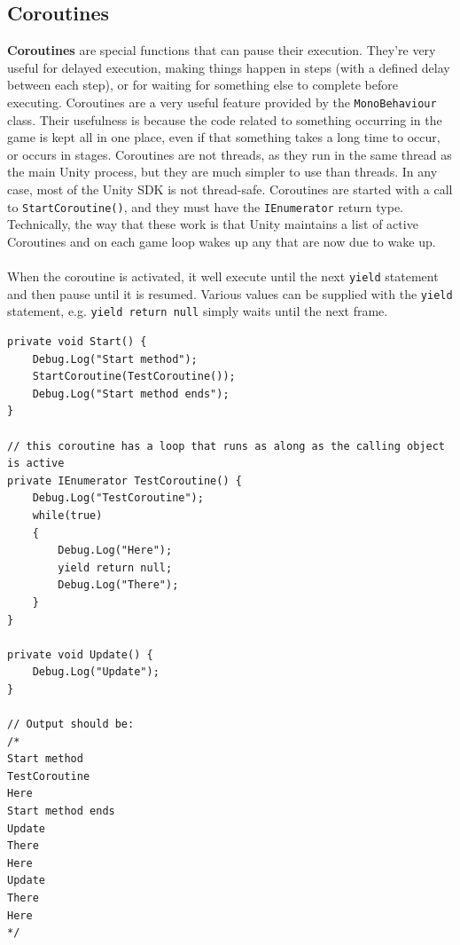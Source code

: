 \documentclass[a4paper,11pt]{article}
\begin{document}
\subsection{Coroutines}
\textbf{Coroutines} are special functions that can pause their execution.
They're very useful for delayed execution, making things happen in steps (with a defined delay between each step), or for 
waiting for something else to complete before executing.
Coroutines are a very useful feature provided by the \verb|MonoBehaviour| class.
Their usefulness is because the code related to something occurring in the game is kept all in one place, even if that 
something takes a long time to occur, or occurs in stages.
Coroutines are not threads, as they run in the same thread as the main Unity process, but they are much simpler to use than 
threads. 
In any case, most of the Unity SDK is not thread-safe.
Coroutines are started with a call to \verb|StartCoroutine()|, and they must have the \verb|IEnumerator| return type.
Technically, the way that these work is that Unity maintains a list of active Coroutines and on each game loop wakes up 
any that are now due to wake up.
\\\\ 
When the coroutine is activated, it well execute until the next \verb|yield| statement and then pause until it is 
resumed.
Various values can be supplied with the \verb|yield| statement, e.g. \verb|yield return null| simply waits until the next
frame.
\begin{verbatim}
private void Start() {
    Debug.Log("Start method");
    StartCoroutine(TestCoroutine());
    Debug.Log("Start method ends");
}

// this coroutine has a loop that runs as along as the calling object is active
private IEnumerator TestCoroutine() {
    Debug.Log("TestCoroutine");
    while(true)
    {
        Debug.Log("Here");
        yield return null;
        Debug.Log("There");
    }
}

private void Update() {
    Debug.Log("Update");
}

// Output should be:
/*
Start method
TestCoroutine
Here
Start method ends
Update
There
Here
Update
There
Here
*/
\end{verbatim}
\end{document}

